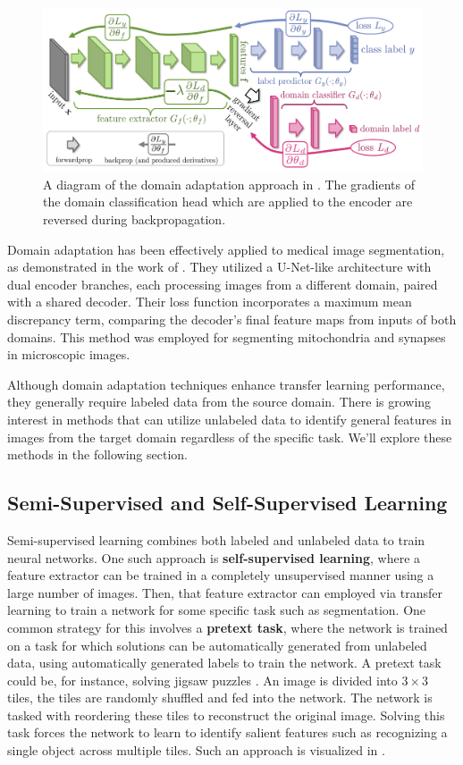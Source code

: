 \begin{figure}[h!]
 \centering
 \includegraphics[width=0.7\linewidth]{images/3/unsup-dom-adpt}
 \caption{A diagram of the domain adaptation approach in \citet{ganinDA2015}. The gradients of the domain classification head which are applied to the encoder are reversed during backpropagation.}
 \label{fig:unsup-dom-adpt}
\end{figure}
	
Domain adaptation has been effectively applied to medical image segmentation, as demonstrated in the work of \citet{bermudez-chaconDomainadaptiveTwostreamUNet2018}. They utilized a U-Net-like architecture with dual encoder branches, each processing images from a different domain, paired with a shared decoder. Their loss function incorporates a maximum mean discrepancy term, comparing the decoder’s final feature maps from inputs of both domains. This method was employed for segmenting mitochondria and synapses in microscopic images.

Although domain adaptation techniques enhance transfer learning performance, they generally require labeled data from the source domain. There is growing interest in methods that can utilize unlabeled data to identify general features in images from the target domain regardless of the specific task. We'll explore these methods in the following section.

	\subsection{Semi-Supervised and Self-Supervised Learning}
	
Semi-supervised learning combines both labeled and unlabeled data to train neural networks. One such approach is \textbf{self-supervised learning}, where a feature extractor can be trained in a completely unsupervised manner using a large number of images. Then, that feature extractor can employed via transfer learning to train a network for some specific task such as segmentation. One common strategy for this involves a \textbf{pretext task}, where the network is trained on a task for which solutions can be automatically generated from unlabeled data, using automatically generated labels to train the network. A pretext task could be, for instance, solving jigsaw puzzles \cite{norooziUnsupervisedLearningVisual2016}. An image is divided into $3 \times 3$ tiles, the tiles are randomly shuffled and fed into the network. The network is tasked with reordering these tiles to reconstruct the original image. Solving this task forces the network to learn to identify salient features such as recognizing a single object across multiple tiles. Such an approach is visualized in .

